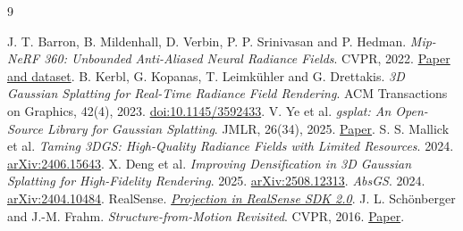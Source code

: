 \documentclass[11pt,a4paper]{article}
\begin{document}
\clearpage
{}
{}
\begin{thebibliography}{9}
\small\raggedright
\setlength{\itemsep}{4pt}
J. T. Barron, B. Mildenhall, D. Verbin, P. P. Srinivasan and P. Hedman.
\emph{Mip-NeRF 360: Unbounded Anti-Aliased Neural Radiance Fields}.
CVPR, 2022. \href{https://jonbarron.info/mipnerf360/}{Paper and dataset}.
B. Kerbl, G. Kopanas, T. Leimk\"uhler and G. Drettakis.
\emph{3D Gaussian Splatting for Real-Time Radiance Field Rendering}.
ACM Transactions on Graphics, 42(4), 2023.
\href{https://doi.org/10.1145/3592433}{doi:10.1145/3592433}.
V. Ye et al. \emph{gsplat: An Open-Source Library for Gaussian Splatting}.
JMLR, 26(34), 2025. \href{https://www.jmlr.org/papers/v26/24-1476.html}{Paper}.
S. S. Mallick et al. \emph{Taming 3DGS: High-Quality Radiance Fields with
Limited Resources}. 2024. \href{https://arxiv.org/abs/2406.15643}{arXiv:2406.15643}.
X. Deng et al. \emph{Improving Densification in 3D Gaussian Splatting for
High-Fidelity Rendering}. 2025. \href{https://arxiv.org/abs/2508.12313}{arXiv:2508.12313}.
\emph{AbsGS}. 2024.
\href{https://arxiv.org/abs/2404.10484}{arXiv:2404.10484}.
RealSense. \href{https://dev.realsenseai.com/docs/projection-in-realsense-sdk-2-0/}{\emph{Projection in RealSense SDK 2.0}}.
J. L. Sch\"onberger and J.-M. Frahm. \emph{Structure-from-Motion Revisited}.
CVPR, 2016. \href{https://openaccess.thecvf.com/content_cvpr_2016/html/Schonberger_Structure-From-Motion_Revisited_CVPR_2016_paper.html}{Paper}.
\end{thebibliography}
\label{report-end}
\end{document}
